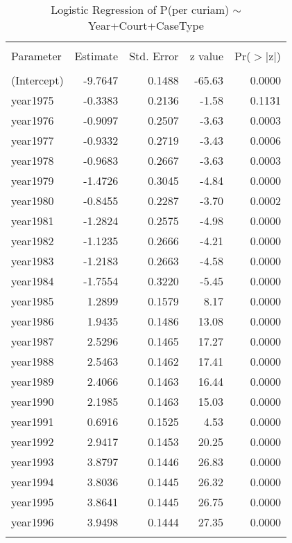 \documentclass[10pt, letterpaper]{article}
\begin{document}
\begin{spacing}{1.0}
\begin{longtable}{lrrrr}
    \caption{Logistic Regression of P(per curiam) $\sim$ Year+Court+CaseType}\\
        \hline\\[-8pt]
        Parameter & Estimate & Std. Error & z value & Pr($>$$|$z$|$) \\[2pt]
        \hline\\[-6pt]
        (Intercept) & -9.7647 & 0.1488 & -65.63 & 0.0000 \\ 
        year1975 & -0.3383 & 0.2136 & -1.58 & 0.1131 \\ 
        year1976 & -0.9097 & 0.2507 & -3.63 & 0.0003 \\ 
        year1977 & -0.9332 & 0.2719 & -3.43 & 0.0006 \\ 
        year1978 & -0.9683 & 0.2667 & -3.63 & 0.0003 \\ 
        year1979 & -1.4726 & 0.3045 & -4.84 & 0.0000 \\ 
        year1980 & -0.8455 & 0.2287 & -3.70 & 0.0002 \\ 
        year1981 & -1.2824 & 0.2575 & -4.98 & 0.0000 \\ 
        year1982 & -1.1235 & 0.2666 & -4.21 & 0.0000 \\ 
        year1983 & -1.2183 & 0.2663 & -4.58 & 0.0000 \\ 
        year1984 & -1.7554 & 0.3220 & -5.45 & 0.0000 \\ 
        year1985 & 1.2899 & 0.1579 & 8.17 & 0.0000 \\ 
        year1986 & 1.9435 & 0.1486 & 13.08 & 0.0000 \\ 
        year1987 & 2.5296 & 0.1465 & 17.27 & 0.0000 \\ 
        year1988 & 2.5463 & 0.1462 & 17.41 & 0.0000 \\ 
        year1989 & 2.4066 & 0.1463 & 16.44 & 0.0000 \\ 
        year1990 & 2.1985 & 0.1463 & 15.03 & 0.0000 \\ 
        year1991 & 0.6916 & 0.1525 & 4.53 & 0.0000 \\ 
        year1992 & 2.9417 & 0.1453 & 20.25 & 0.0000 \\ 
        year1993 & 3.8797 & 0.1446 & 26.83 & 0.0000 \\ 
        year1994 & 3.8036 & 0.1445 & 26.32 & 0.0000 \\ 
        year1995 & 3.8641 & 0.1445 & 26.75 & 0.0000 \\ 
        year1996 & 3.9498 & 0.1444 & 27.35 & 0.0000 \\ 
$$
\end{longtable}
\end{spacing}
\end{document}
